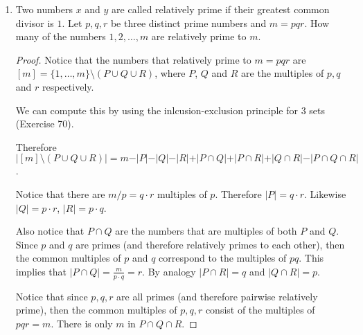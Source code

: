 \documentclass[12pt]{article}
\begin{document}
\begin{enumerate}
\begin{proof}
    Assume by elimination of the disjunction that there is no antichain with $s+1$ elements in the lattice $L$, therefore if $\mathcal{C}^*$ is an antichain , then it has at most $s$ elements. Notice that the smallest chain cover for $L$ has at most $s$ elements. Let $C_1 , \ldots, C_s$ be the smallest chain cover for $L$. Applying the pigeonhole principle yields that there exists an $i$ such that  $\vert C_i \vert \geq r+1$. Let $C $ be any $r+1$ element subset of $C_i$. Notice that $C$ is a chain of $L$ with $r+1$ elements.
    
    \end{proof}
    
    \item Two numbers $x$ and $y$ are called relatively prime if their greatest common divisor is $1$. Let $p,q,r$ be three distinct prime numbers and $ m = pqr$. How many of the numbers $1,2, \ldots , m$ are relatively prime to $m$.
    
    \begin{proof}
    
    Notice that the numbers that relatively prime to $m = pqr$ are $[m]=\{1,\ldots,m\} \setminus (P \cup Q \cup R)$, where $P$, $Q$ and $R$ are the multiples of $p,q$ and $r$ respectively.
    
    We can compute this by using the inlcusion-exclusion principle for 3 sets (Exercise 70). 
    
    Therefore  $\vert [m]\setminus (P \cup Q \cup R) \vert = m - \vert P \vert - \vert Q \vert - \vert R \vert + \vert P \cap Q \vert + \vert P \cap R \vert + \vert Q \cap R \vert - \vert P \cap Q \cap R \vert $.
    
    Notice that there are $m/p = q \cdot r$ multiples of $p$. Therefore $\vert P \vert = q \cdot r$. Likewise  $\vert Q \vert = p \cdot r$, $\vert R \vert = p \cdot q$.
    
    Also notice that $P \cap Q$ are the numbers that are multiples of both $P$ and $Q$. Since $p$ and $q$ are primes (and therefore relatively primes to each other), then the common multiples of $p$ and $q$ correspond to the multiples of $pq$. This implies that $\vert P \cap Q \vert = \frac{m}{p \cdot q} = r$. By analogy $\vert P \cap R \vert = q$ and $\vert Q \cap R \vert = p$.
    
    Notice that since $p,q,r$ are all primes (and therefore pairwise relatively prime), then the common multiples of $p,q,r$ consist of the multiples of $pqr=m$. There is only $m$ in $P \cap Q \cap R$.
    

\end{proof}
\end{enumerate}
\end{document}
